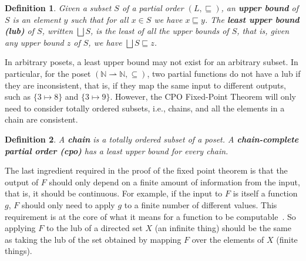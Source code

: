 \documentclass{tufte-handout}
\newtheorem{definition}{Definition}%
\begin{document}
\begin{definition}
Given a subset $S$ of a partial order $(L,\sqsubseteq)$, an
\textbf{\emph{upper bound}} of $S$ is an element $y$ such that for all
$x \in S$ we have $x \sqsubseteq y$.  The \textbf{\emph{least upper
    bound (lub)}} of $S$, written $\bigsqcup S$, is the least of all
the upper bounds of $S$, that is, given any upper bound $z$ of $S$, we
have $\bigsqcup S \sqsubseteq z$.
\end{definition}

In arbitrary posets, a least upper bound may not exist for an
arbitrary subset. In particular, for the poset
$(\mathbb{N}{\rightharpoonup}\mathbb{N}, \subseteq)$, two partial
functions do not have a lub if they are inconsistent, that is, if they
map the same input to different outputs, such as $\{3\mapsto 8\}$ and
$\{3 \mapsto 9\}$. However, the CPO Fixed-Point Theorem will only need to
consider totally ordered subsets, i.e., chains, and all the elements
in a chain are consistent.

\begin{definition}
  A \textbf{\emph{chain}} is a totally ordered subset of a poset.  A
  \textbf{\emph{chain-complete partial order (cpo)}} has a least upper
  bound for every chain.
\end{definition}




The last ingredient required in the proof of the fixed point theorem
is that the output of $F$ should only depend on a finite amount of
information from the input, that is, it should be continuous. For
example, if the input to $F$ is itself a function $g$, $F$ should only
need to apply $g$ to a finite number of different values.  This
requirement is at the core of what it means for a function to be
computable~\citep{Gunter:1990aa}.  So applying $F$ to the lub of a
directed set $X$ (an infinite thing) should be the same as taking the
lub of the set obtained by mapping $F$ over the elements of $X$
(finite things).
\end{document}
